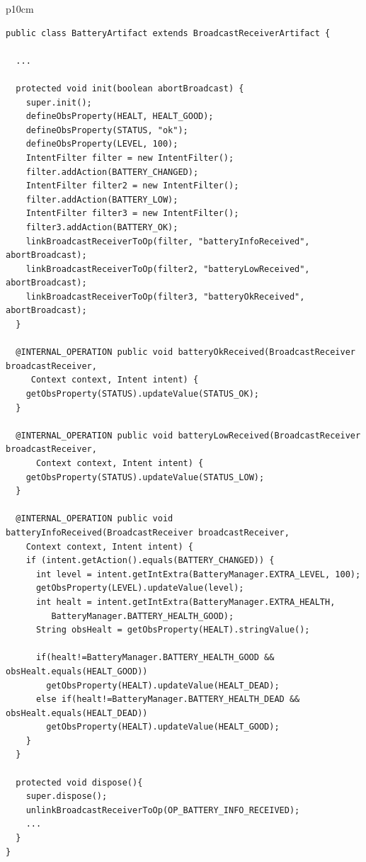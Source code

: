 \documentclass[11pt]{report}
\newcommand\labeltab[1]{\label{tb:#1}}
\begin{document}
\begin{table}[!ht]
\begin{tabular} {p{10cm}}
\begin{minipage}{10cm}
{\scriptsize \begin{verbatim}
public class BatteryArtifact extends BroadcastReceiverArtifact {
	
  ...
	
  protected void init(boolean abortBroadcast) {
    super.init();
    defineObsProperty(HEALT, HEALT_GOOD);
    defineObsProperty(STATUS, "ok");
    defineObsProperty(LEVEL, 100);
    IntentFilter filter = new IntentFilter();
    filter.addAction(BATTERY_CHANGED);
    IntentFilter filter2 = new IntentFilter();
    filter.addAction(BATTERY_LOW);
    IntentFilter filter3 = new IntentFilter();
    filter3.addAction(BATTERY_OK);
    linkBroadcastReceiverToOp(filter, "batteryInfoReceived", abortBroadcast);
    linkBroadcastReceiverToOp(filter2, "batteryLowReceived", abortBroadcast);
    linkBroadcastReceiverToOp(filter3, "batteryOkReceived", abortBroadcast);
  }
	
  @INTERNAL_OPERATION public void batteryOkReceived(BroadcastReceiver broadcastReceiver, 
     Context context, Intent intent) {
    getObsProperty(STATUS).updateValue(STATUS_OK);
  }

  @INTERNAL_OPERATION public void batteryLowReceived(BroadcastReceiver broadcastReceiver, 
      Context context, Intent intent) {
    getObsProperty(STATUS).updateValue(STATUS_LOW);
  }
	
  @INTERNAL_OPERATION public void batteryInfoReceived(BroadcastReceiver broadcastReceiver, 
    Context context, Intent intent) {
    if (intent.getAction().equals(BATTERY_CHANGED)) {
      int level = intent.getIntExtra(BatteryManager.EXTRA_LEVEL, 100);
      getObsProperty(LEVEL).updateValue(level);
      int healt = intent.getIntExtra(BatteryManager.EXTRA_HEALTH, 
         BatteryManager.BATTERY_HEALTH_GOOD);
      String obsHealt = getObsProperty(HEALT).stringValue();

      if(healt!=BatteryManager.BATTERY_HEALTH_GOOD && obsHealt.equals(HEALT_GOOD))
        getObsProperty(HEALT).updateValue(HEALT_DEAD);
      else if(healt!=BatteryManager.BATTERY_HEALTH_DEAD && obsHealt.equals(HEALT_DEAD))
        getObsProperty(HEALT).updateValue(HEALT_GOOD);
    } 
  }
	
  protected void dispose(){
    super.dispose();
    unlinkBroadcastReceiverToOp(OP_BATTERY_INFO_RECEIVED);
    ...
  }
}
\end{verbatim}}
\end{minipage}
\end{tabular}
\caption{Source code snippet of the \textsf{BatteryArtifact}.}
    \labeltab{BatteryArtifact}
\end{table}
\end{document}
